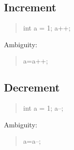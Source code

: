 
\subsection{Increment}

\begin{quote}
int a = 1;
a++;
\end{quote}


Ambiguity:
\begin{quote}
a=a++;
\end{quote}


\subsection{Decrement}

\begin{quote}
int a = 1;
a--;
\end{quote}

Ambiguity:
\begin{quote}
a=a--;
\end{quote}



